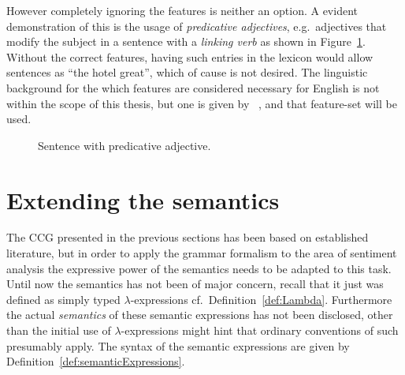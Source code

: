 However completely ignoring the features is neither an option. A evident demonstration of this is the usage of \emph{predicative adjectives}, e.g.\ adjectives that modify the subject in a sentence with a \emph{linking verb} as shown in Figure~\ref{fig:predicateAdj}. Without the correct features, having such entries in the lexicon would allow sentences as ``the hotel great'', which of cause is not desired. The linguistic background for the which features are considered necessary for English is not within the scope of this thesis, but one is given by \citeauthor{juliaThesis}~, and that feature-set will be used.
\begin{figure}[ht]
\center
{}
\caption{Sentence with predicative adjective.}
\label{fig:predicateAdj}
\end{figure}

\section{Extending the semantics}
\label{sec:extendingSemantics}
The CCG presented in the previous sections has been based on established literature, but in order to apply the grammar formalism to the area of sentiment analysis the expressive power of the semantics needs to be adapted to this task. Until now the semantics has not been of major concern, recall that it just was defined as simply typed $\lambda$-expressions cf.\ Definition~\ref{def:Lambda}. Furthermore the actual \emph{semantics} of these semantic expressions has not been disclosed, other than the initial use of $\lambda$-expressions might hint that ordinary conventions of such presumably apply. The syntax of the semantic expressions are given by Definition~\ref{def:semanticExpressions}.

